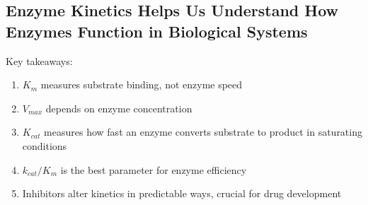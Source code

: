 \documentclass[10pt]{article}
\begin{document}
\subsection*{Enzyme Kinetics Helps Us Understand How Enzymes Function in Biological Systems}
Key takeaways:
\begin{enumerate}
    \item $K_m$ measures substrate binding, not enzyme speed
    \item $V_{max}$ depends on enzyme concentration
    \item $K_{cat}$ measures how fast an enzyme converts substrate to product in saturating conditions
    \item $k_{cat} / K_m$ is the best parameter for enzyme efficiency
    \item Inhibitors alter kinetics in predictable ways, crucial for drug development
\end{enumerate}
\end{document}
